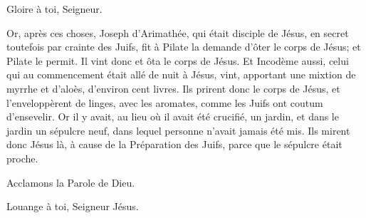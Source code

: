 \rubricatum{\Rbardot{}} Gloire à toi, Seigneur.

Or, après ces choses, Joseph d'Arimathée, qui était disciple de Jésus, en
secret toutefois par crainte des Juifs, fit à Pilate la demande d'ôter le
corps de Jésus; et Pilate le permit. Il vint donc et ôta le corps de Jésus.
Et Incodème aussi, celui qui au commencement était allé de nuit à Jésus,
vint, apportant une mixtion de myrrhe et d'aloès, d'environ cent livres. Ils
prirent donc le corps de Jésus, et l'enveloppèrent de linges, avec les
aromates, comme les Juifs ont coutum d'ensevelir. Or il y avait, au lieu où
il avait été crucifié, un jardin, et dans le jardin un sépulcre neuf, dans
lequel personne n'avait jamais été mis. Ils mirent donc Jésus là, à cause de
la Préparation des Juifs, parce que le sépulcre était proche.

Acclamons la Parole de Dieu.

\rubricatum{\Rbardot{}} Louange à toi, Seigneur Jésus.
